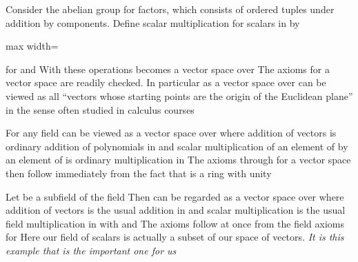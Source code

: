 \documentclass[11pt,oneside]{article}
\begin{document}
\begin{BookBody}

 Consider the abelian group  for  factors, which consists of ordered tuples under addition by components. Define scalar multiplication for scalars in  by

\begin{center}\begin{adjustbox}{max width=\linewidth}\end{adjustbox}\end{center}

\noindent for  and  With these operations becomes a vector space over  The axioms for a vector space are readily checked. In particular as a vector space over  can be viewed as all “vectors whose starting points are the origin of the Euclidean plane” in the sense often studied in calculus courses\BookEnd{\blacktriangle}

 For any field  can be viewed as a vector space over  where addition of vectors is ordinary addition of polynomials in  and scalar multiplication  of an element of  by an element of  is ordinary multiplication in  The axioms  through  for a vector space then follow immediately from the fact that  is a ring with unity\BookEnd{\blacktriangle}

 Let  be a subfield of the field  Then  can be regarded as a vector space over  where addition of vectors is the usual addition in  and scalar multiplication  is the usual field multiplication in  with  and  The axioms follow at once from the field axioms for  Here our field of scalars is actually a subset of our space of vectors.\textit{ It is this example that is the important one for us}\BookEnd{\blacktriangle}


\end{BookBody}
\end{document}

